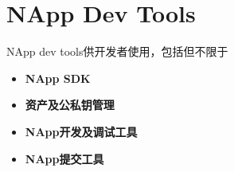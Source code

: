 \section{NApp Dev Tools}

NApp dev tools供开发者使用，包括但不限于
\begin{itemize}
\item \textbf{NApp SDK}
\item \textbf{资产及公私钥管理}
\item \textbf{NApp开发及调试工具}
\item \textbf{NApp提交工具}
\end{itemize}


